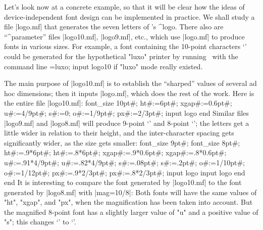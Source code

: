 {{{{%

Let's look now at a concrete example, so that it will be clear how the
ideas of device-independent font design can be implemented in practice.
We shall study a file |logo.mf| that generates the seven letters of
\MF's ^{logo}. There also are ``^{parameter}'' files |logo10.mf|, |logo9.mf|,
etc., which use |logo.mf| to produce fonts in various sizes. For
example, a font containing the 10-point characters `\thinspace\MF\thinspace'
could be generated for the hypothetical "luxo" printer by running \MF\ with
the command line
\begintt
\mode=luxo; input logo10
\endtt
if "luxo" mode really existed.

The main purpose of |logo10.mf| is to establish the ``sharped'' values of
several ad hoc dimensions; then it inputs |logo.mf|, which does the
rest of the work. Here is the entire file |logo10.mf|:
\begintt
font_size 10pt#;   %
ht#:=6pt#;         %
xgap#:=0.6pt#;     %
u#:=4/9pt#;        %
s#:=0;             %
o#:=1/9pt#;        %
px#:=2/3pt#;       %
input logo         %
end                %
\endtt
Similar files |logo9.mf| and |logo8.mf| will produce 9-point
`\thinspace' and \hbox{8-point}
`\thinspace'; the letters get a little
wider in relation to their height, and the inter-character spacing
gets significantly wider, as the size gets smaller:
\begintt
font_size 9pt#;                font_size 8pt#;
ht#:=.9*6pt#;                  ht#:=.8*6pt#;
xgap#:=.9*0.6pt#;              xgap#:=.8*0.6pt#;
u#:=.91*4/9pt#;                u#:=.82*4/9pt#;
s#:=.08pt#;                    s#:=.2pt#;
o#:=1/10pt#;                   o#:=1/12pt#;
px#:=.9*2/3pt#;                px#:=.8*2/3pt#;
input logo                     input logo
end                            end
\endtt
It is interesting to compare the font generated by |logo10.mf| to the
font generated by |logo8.mf| with |mag=10/8|: Both fonts will have
the same values of "ht", "xgap", and "px", when the magnification has been
taken into account. But the magnified 8-point font has a slightly larger
value of "u" and a positive value of "s"; this changes
`\thinspace\MF\thinspace' to `\thinspace'.

}}}}
